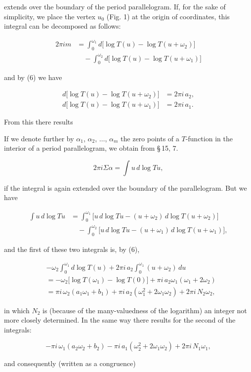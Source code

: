 extends over the boundary of the period parallelogram. If, for the sake of simplicity, we place the vertex $u_0$ (Fig. 1) at the origin of coordinates, this integral can be decomposed as follows:

\[
\begin{aligned}
2\pi i m &= \int_0^{\omega_1} d\bigl[\log T(u) - \log T(u+\omega_2)\bigr]\\
&\quad - \int_0^{\omega_2} d\bigl[\log T(u) - \log T(u+\omega_1)\bigr]
\end{aligned}
\]

and by (6) we have

\[
\begin{aligned}
d\bigl[\log T(u) - \log T(u+\omega_2)\bigr] &= 2\pi i\,a_2,\\
d\bigl[\log T(u) - \log T(u+\omega_1)\bigr] &= 2\pi i\,a_1.
\end{aligned}
\]

From this there results


If we denote further by $\alpha_1$, $\alpha_2$, $\ldots$, $\alpha_m$ the zero points of a $T$-function in the interior of a period parallelogram, we obtain from \S\,15, 7.

\[
2\pi i \Sigma\alpha = \int u\,d\log Tu,
\]

if the integral is again extended over the boundary of the parallelogram. But we have

\[
\begin{aligned}
\int u\,d\log Tu &= \int_0^{\omega_1} \bigl[u\,d\log Tu - (u+\omega_2)\,d\log T(u+\omega_2)\bigr]\\
&\quad - \int_0^{\omega_2} \bigl[u\,d\log Tu - (u+\omega_1)\,d\log T(u+\omega_1)\bigr],
\end{aligned}
\]

and the first of these two integrals is, by (6),

\[
\begin{aligned}
&-\omega_2\int_0^{\omega_1} d\log T(u) + 2\pi i\,a_2\int_0^{\omega_1} (u+\omega_2)\,du\\
&= -\omega_2\bigl[\log T(\omega_1) - \log T(0)\bigr] + \pi i\,a_2\omega_1(\omega_1+2\omega_2)\\
&= \pi i\,\omega_2(a_1\omega_1+b_1) + \pi i\,a_2(\omega_1^2+2\omega_1\omega_2) + 2\pi i\,N_2\omega_2,
\end{aligned}
\]

in which $N_2$ is (because of the many-valuedness of the logarithm) an integer not more closely determined. In the same way there results for the second of the integrals:

\[
-\pi i\,\omega_1(a_2\omega_2+b_2) - \pi i\,a_1(\omega_2^2+2\omega_1\omega_2) + 2\pi i\,N_1\omega_1,
\]

and consequently (written as a congruence)

